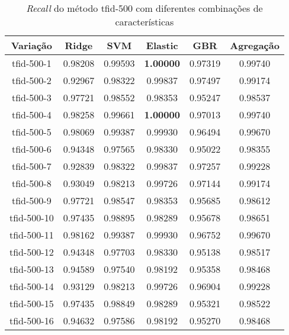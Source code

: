 \begin{table}[H]
\label{tab:recalltfid500}
\centering
\begin{tabular}{|c| c c  c  c  c| }
\hline
Variação &  Ridge & SVM & Elastic & GBR & Agregação  \\ 
\hline
tfid-500-1 & 0.98208 & 0.99593 & \textbf{1.00000} & 0.97319 & 0.99740 \\
\hline
tfid-500-2 & 0.92967 & 0.98322 & 0.99837 & 0.97497 & 0.99174 \\
\hline
tfid-500-3 & 0.97721 & 0.98552 & 0.98353 & 0.95247 & 0.98537 \\
\hline
tfid-500-4 & 0.98258 & 0.99661 & \textbf{1.00000} & 0.97013 & 0.99740 \\
\hline
tfid-500-5 & 0.98069 & 0.99387 & 0.99930 & 0.96494 & 0.99670 \\
\hline
tfid-500-6 & 0.94348 & 0.97565 & 0.98330 & 0.95022 & 0.98355 \\
\hline
tfid-500-7 & 0.92839 & 0.98322 & 0.99837 & 0.97257 & 0.99228 \\
\hline
tfid-500-8 & 0.93049 & 0.98213 & 0.99726 & 0.97144 & 0.99174 \\
\hline
tfid-500-9 & 0.97721 & 0.98547 & 0.98353 & 0.95685 & 0.98612 \\
\hline
tfid-500-10 & 0.97435 & 0.98895 & 0.98289 & 0.95678 & 0.98651 \\
\hline
tfid-500-11 & 0.98162 & 0.99387 & 0.99930 & 0.96752 & 0.99670 \\
\hline
tfid-500-12 & 0.94348 & 0.97703 & 0.98330 & 0.95138 & 0.98517 \\
\hline
tfid-500-13 & 0.94589 & 0.97540 & 0.98192 & 0.95358 & 0.98468 \\
\hline
tfid-500-14 & 0.93129 & 0.98213 & 0.99726 & 0.96904 & 0.99228 \\
\hline
tfid-500-15 & 0.97435 & 0.98849 & 0.98289 & 0.95321 & 0.98522 \\
\hline
tfid-500-16 & 0.94632 & 0.97586 & 0.98192 & 0.95270 & 0.98468 \\
\hline
\end{tabular}
\caption{\textit{Recall} do método tfid-500 com diferentes combinações de características}
\end{table}

